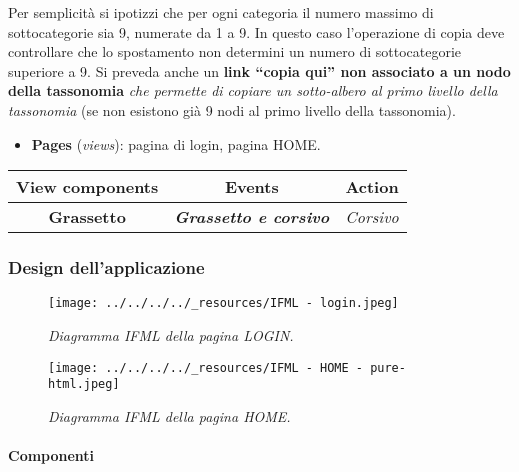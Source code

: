 Per semplicità si ipotizzi che per ogni categoria il numero massimo di
sottocategorie sia 9, numerate da 1 a 9. In questo caso l'operazione di
copia deve controllare che lo spostamento non determini un numero di
sottocategorie superiore a 9. Si preveda anche un \textbf{link ``copia
qui'' non associato a un nodo della tassonomia} \emph{che permette di
copiare un sotto-albero al primo livello della tassonomia} (se non
esistono già 9 nodi al primo livello della tassonomia).

\begin{itemize}
\tightlist
\item
  \textbf{Pages} (\emph{views}): pagina di login, pagina HOME.
\end{itemize}

\begin{longtable}[]{@{}ccc@{}}
\toprule()
View components & Events & Action \\
\midrule()
\endhead
\textbf{Grassetto} & \textbf{\emph{Grassetto e corsivo}} &
\emph{Corsivo} \\
\bottomrule()
\end{longtable}

\pagebreak

\hypertarget{design-dellapplicazione}{%
\subsubsection{Design dell'applicazione}\label{design-dellapplicazione}}

\begin{figure}
\centering
\texttt{[image: ../../../../\_resources/IFML - login.jpeg]}
\caption{\emph{Diagramma IFML della pagina LOGIN.}}
\end{figure}

\begin{figure}
\centering
\texttt{[image: ../../../../\_resources/IFML - HOME - pure-html.jpeg]}
\caption{\emph{Diagramma IFML della pagina HOME.}}
\end{figure}

\pagebreak

\hypertarget{componenti}{%
\paragraph{Componenti}\label{componenti}}

